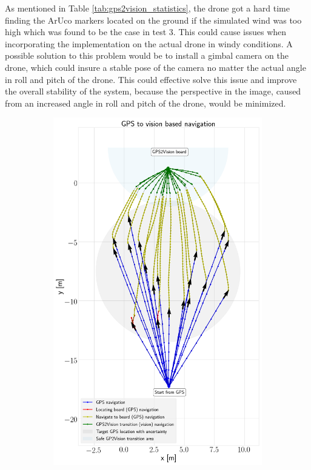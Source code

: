 \documentclass[../Head/report.tex]{subfiles}
\begin{document}
As mentioned in Table \ref{tab:gps2vision_statistics}, the drone got a hard time finding the ArUco markers located on the ground if the simulated wind was too high which was found to be the case in test 3. This could cause issues when incorporating the implementation on the actual drone in windy conditions. A possible solution to this problem would be to install a gimbal camera on the drone, which could insure a stable pose of the camera no matter the actual angle in roll and pitch of the drone. This could effective solve this issue and improve the overall stability of the system, because the perspective in the image, caused from an increased angle in roll and pitch of the drone, would be minimized.
  
\begin{figure}[H]
    \centering
    \begin{subfigure}[t]{.45\textwidth}
        \centering
        \includegraphics[width=\textwidth]{../Figures/GPS2Vision/test1_noWind_20_runs/gps2vision.png}

\end{subfigure}
\end{figure}
\end{document}
